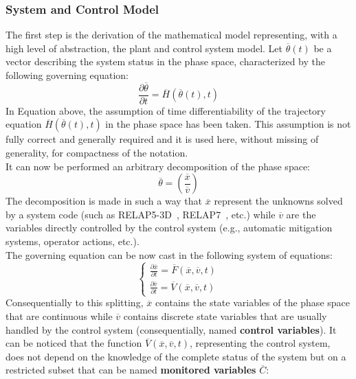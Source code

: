 \subsubsection{System and Control Model}
\label{subsub:controlAndSystem}
The first step is the derivation of the mathematical model representing, with a high 
level of abstraction, the plant and control system model. Let $\overline{\theta}\left ( t 
\right )$ be a vector describing the system status in the phase space, characterized 
by the following governing equation:
\begin{equation}
\label{eq:dThetaOverDT}
\frac{\partial \overline{\theta} }{\partial t}=\overline{H}\left (  \overline{\theta}\left ( t \right ),t \right )
\end{equation}
In Equation above, the assumption of time differentiability of the trajectory equation $\overline{H}\left (  \overline{\theta}\left ( t \right ),t \right )$ in the phase space has been taken. This assumption is not fully correct and generally required and it is used here, without missing of generality, for compactness of the notation.
\\It can now be performed an arbitrary decomposition of the phase space:
\begin{equation}
\label{eq:thetaDecomposition}
  \overline{\theta} = \left (\frac{\overline{x}}{\overline{v}}  \right )
\end{equation}
The decomposition is made in such a way that $\overline{x}$ represent the unknowns 
solved by a system code (such as RELAP5-3D~\cite{RELAP5userManual}, 
RELAP7~\cite{relap7FY12}, etc.) while $\overline{v}$ are the variables directly 
controlled by the control system (e.g., automatic mitigation systems, operator actions, 
etc.).
\\The governing equation can be now cast in the following system of equations:
\begin{equation}
\label{eq:governingEquations}
\left\{\begin{matrix}
\frac{\partial \overline{x} }{\partial t} = \overline{F}\left (  \overline{x}, \overline{v}, t \right )  \\ 
\frac{\partial \overline{v} }{\partial t} = \overline{V}\left (  \overline{x}, \overline{v}, t \right )
\end{matrix}\right.
\end{equation}
Consequentially to this splitting, $\overline{x}$ contains the state variables of the 
phase space that are continuous while $\overline{v}$ contains discrete state 
variables that are usually handled by the control system (consequentially, named 
\textbf{control variables}). It can be noticed that the
function  $ \overline{V}\left (  \overline{x}, \overline{v}, t \right )$, representing the 
control system, does not depend on the  knowledge of the complete status of the 
system but on a restricted subset that can be named \textbf{monitored variables} $\overline{C}$:

